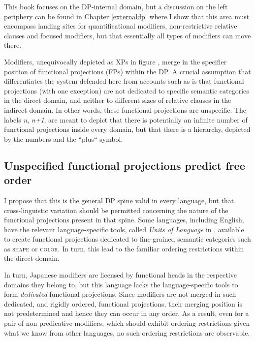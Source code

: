 \documentclass [output=book,colorlinks,citecolor=brown]{langscibook}
\begin{document}
This book focuses on the DP-internal domain, but a discussion on the left periphery can be found in Chapter \ref{externaldp} where I show that this area must encompass landing sites for quantificational modifiers, non-restrictive relative clauses and focused modifiers, but that essentially all types of modifiers can move there.

Modifiers, unequivocally depicted as XPs in figure , merge in the specifier position of functional projections (FPs) within the DP. A crucial assumption that differentiates the system defended here from accounts such as \citet{cinque:2010:adj, cinque:2020:relcl} is that functional projections (with one exception) are not dedicated to specific semantic categories in the direct domain, and neither to different sizes of relative clauses in the indirect domain. In other words, these functional projections are unspecific. The labels \textit{n}, \textit{n+1}, are meant to depict that there is potentially an infinite number of functional projections inside every domain, but that there is a hierarchy, depicted by the numbers and the ``plus“ symbol.

\subsection{Unspecified functional projections predict free order}

I propose that this is the general DP spine valid in every language, but that cross-linguistic variation should be permitted concerning the nature of the functional projections present in that spine. Some languages, including English, have the relevant language-specific tools, called \textit{Units of Language} in \citet{wiltschko:2014:universal}, available to create functional projections dedicated to fine-grained semantic categories such as \textsc{shape} or \textsc{color}. In turn, this lead to the familiar ordering restrictions within the direct domain. %

In turn, Japanese modifiers are licensed by functional heads in the respective domains they belong to, but this language lacks the language-specific tools to form \textit{dedicated} functional projections. Since modifiers are not merged in such dedicated, and rigidly ordered, functional projections, their merging position is not predetermined and hence they can occur in any order. As a result, even for a pair of non-predicative modifiers, which should exhibit ordering restrictions given what we know from other languages, no such ordering restrictions are observable.
\end{document}
